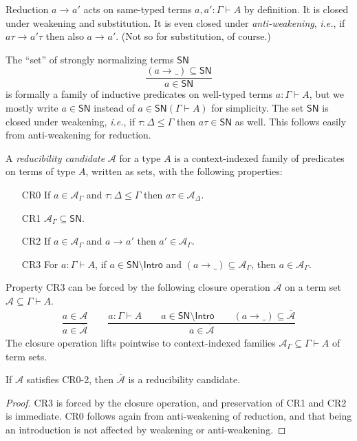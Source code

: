 \documentclass[a4paper,USenglish,cleveref, autoref, thm-restate]{lipics-v2019}
\newcommand{\ie}{\emph{i.e.}\xspace}
\newcommand{\ru}{\dfrac}
\newcommand{\red}[1][]{\longrightarrow_{#1}}
\newcommand{\cl}[1]{\overline{#1}}
\newcommand{\A}{\mathcal{A}}
\newcommand{\SN}{\mathsf{SN}}
\newcommand{\Intro}{\mathsf{Intro}}
\begin{document}
Reduction $a \red a'$ acts on same-typed terms
$a,a' : \Gamma \vdash A$ by definition.  It is closed under weakening
and substitution.  It is even closed under \emph{anti-weakening}, \ie,
if $a\tau \red a'\tau$ then also $a \red a'$.  (Not so for
substitution, of course.)

The ``set'' of strongly normalizing terms $\SN$
\[
  \ru{(a \red \_) \subseteq \SN
    }{a \in \SN}
\]
is formally a family of inductive predicates on well-typed terms
$a : \Gamma \vdash A$, but we mostly write $a \in \SN$ instead of
$a \in \SN(\Gamma \vdash A)$ for simplicity.  The set $\SN$ is closed
under weakening, \ie, if $\tau : \Delta \leq \Gamma$ then
$a\tau \in \SN$ as well.  This follows easily from anti-weakening for
reduction.

A \emph{reducibility candidate} $\A$ for a type $A$ is a context-indexed
family of predicates on terms of type $A$, written as sets, with the following
properties:
\begin{itemize}
\item[CR0]  If $a \in \A_\Gamma$ and $\tau : \Delta \leq \Gamma$ then
  $a\tau \in \A_\Delta$.
\item[CR1]  $\A_\Gamma \subseteq \SN$.
\item[CR2]  If $a \in \A_\Gamma$ and $a \red a'$ then $a' \in
  \A_\Gamma$.
\item[CR3]  For $a : \Gamma \vdash A$, if $a \in \SN \setminus \Intro$
  and $(a \red \_) \subseteq \A_\Gamma$, then $a \in \A_\Gamma$.
\end{itemize}

Property CR3 can be forced by the following closure operation $\cl\A$
on a term set $\A \subseteq \Gamma \vdash A$.
\begin{gather*}
  \ru{a \in \A
    }{a \in \cl\A}
\qquad
  \ru{a : \Gamma \vdash A \qquad
      a \in \SN \setminus \Intro \qquad
      (a \red \_) \subseteq \cl\A
    }{a \in \cl\A}
\end{gather*}
The closure operation lifts pointwise to context-indexed families
$\A_\Gamma \subseteq \Gamma \vdash A$ of term sets.

\begin{lemma}[Saturation]
  If $\A$ satisfies CR0-2, then $\cl\A$ is a reducibility candidate.
\end{lemma}
\begin{proof}
  CR3 is forced by the closure operation, and preservation of CR1 and
  CR2 is immediate.
  CR0 follows again from anti-weakening of reduction, and that being
  an introduction is not affected by weakening or anti-weakening.
\end{proof}
\end{document}
